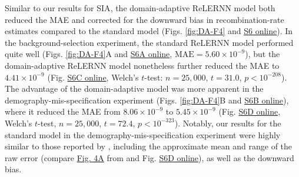 Similar to our results for \ac{SIA}, the domain-adaptive ReLERNN model both reduced the \ac{MAE} and corrected for the downward bias in recombination-rate estimates compared to the standard model (Figs. \ref{fig:DA-F4} and \href{https://journals.plos.org/plosgenetics/article?id=10.1371/journal.pgen.1011032#sec018}{S6 online}). In the background-selection experiment, the standard ReLERNN model performed quite well (Figs. \ref{fig:DA-F4}A and \href{https://journals.plos.org/plosgenetics/article?id=10.1371/journal.pgen.1011032#sec018}{S6A online}, $\mathrm{MAE} = 5.60\times 10^{-9}$), but the domain-adaptive ReLERNN model nonetheless further reduced the MAE to $4.41\times 10^{-9}$ (Fig. \href{https://journals.plos.org/plosgenetics/article?id=10.1371/journal.pgen.1011032#sec018}{S6C online}, Welch’s $t$-test: $n = 25,000$, $t =31.0$, $p<10^{-208}$). The advantage of the domain-adaptive model was more apparent in the demography-mis-specification experiment (Figs. \ref{fig:DA-F4}B and \href{https://journals.plos.org/plosgenetics/article?id=10.1371/journal.pgen.1011032#sec018}{S6B online}), where it reduced the MAE from $8.06\times 10^{-9}$ to $5.45\times 10^{-9}$ (Fig. \href{https://journals.plos.org/plosgenetics/article?id=10.1371/journal.pgen.1011032#sec018}{S6D online}, Welch’s $t$-test, $n = 25,000$, $t = 72.4$, $p<10^{-323}$). Notably, our results for the standard model in the demography-mis-specification experiment were highly similar to those reported by \cite{adrion_predicting_2020}, including the approximate mean and range of the raw error (compare \href{https://academic.oup.com/view-large/figure/204168641/msaa038f4.tif}{Fig. 4A} from \cite{adrion_predicting_2020} and Fig. \href{https://journals.plos.org/plosgenetics/article?id=10.1371/journal.pgen.1011032#sec018}{S6D online}), as well as the downward bias.

